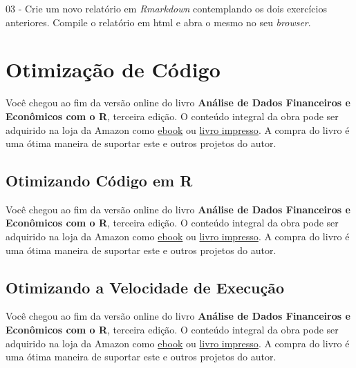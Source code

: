 \documentclass[
  11pt,
]{book}
\newenvironment{pleasebuyit}
{\begin{noteblock}
		
	} {\end{noteblock}}
\begin{document}
03 -
Crie um novo relatório em \emph{Rmarkdown} contemplando os dois exercícios anteriores. Compile o relatório em html e abra o mesmo no seu \emph{browser}.

\hypertarget{otimizacao}{%
\chapter{Otimização de Código}\label{otimizacao}}

\begin{pleasebuyit}
Você chegou ao fim da versão online do livro \textbf{Análise de Dados
Financeiros e Econômicos com o R}, terceira edição. O conteúdo integral
da obra pode ser adquirido na loja da Amazon como
\href{https://www.amazon.com.br/dp/B08WNC27ZY}{ebook} ou
\href{https://www.amazon.com/dp/B08WP8CCDB}{livro impresso}. A compra do
livro é uma ótima maneira de suportar este e outros projetos do autor.
\end{pleasebuyit}

\hypertarget{otimizando-cuxf3digo-em-r}{%
\section{Otimizando Código em R}\label{otimizando-cuxf3digo-em-r}}

\begin{pleasebuyit}
Você chegou ao fim da versão online do livro \textbf{Análise de Dados
Financeiros e Econômicos com o R}, terceira edição. O conteúdo integral
da obra pode ser adquirido na loja da Amazon como
\href{https://www.amazon.com.br/dp/B08WNC27ZY}{ebook} ou
\href{https://www.amazon.com/dp/B08WP8CCDB}{livro impresso}. A compra do
livro é uma ótima maneira de suportar este e outros projetos do autor.
\end{pleasebuyit}

\hypertarget{otimizando-a-velocidade-de-execuuxe7uxe3o}{%
\section{Otimizando a Velocidade de Execução}\label{otimizando-a-velocidade-de-execuuxe7uxe3o}}

\begin{pleasebuyit}
Você chegou ao fim da versão online do livro \textbf{Análise de Dados
Financeiros e Econômicos com o R}, terceira edição. O conteúdo integral
da obra pode ser adquirido na loja da Amazon como
\href{https://www.amazon.com.br/dp/B08WNC27ZY}{ebook} ou
\href{https://www.amazon.com/dp/B08WP8CCDB}{livro impresso}. A compra do
livro é uma ótima maneira de suportar este e outros projetos do autor.
\end{pleasebuyit}
\end{document}

